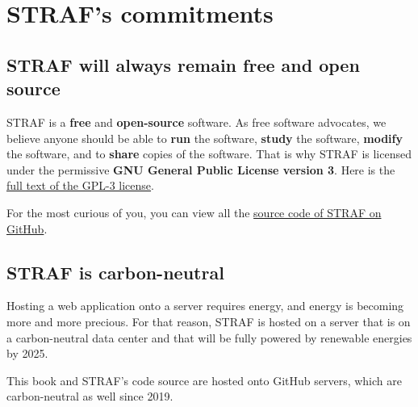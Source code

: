 \documentclass[
]{book}
\begin{document}
\hypertarget{strafs-commitments}{%
\chapter{STRAF's commitments}\label{strafs-commitments}}

\hypertarget{straf-will-always-remain-free-and-open-source}{%
\section{STRAF will always remain free and open source}\label{straf-will-always-remain-free-and-open-source}}

STRAF is a \textbf{free} and \textbf{open-source} software. As free software advocates, we believe
anyone should be able to \textbf{run} the software, \textbf{study} the software,
\textbf{modify} the software, and to \textbf{share} copies of the software. That is why
STRAF is licensed under the permissive \textbf{GNU General Public License version 3}.
Here is the \href{https://www.gnu.org/licenses/gpl-3.0.txt}{full text of the GPL-3 license}.

For the most curious of you, you can view all the \href{https://github.com/agouy/straf}{source code of STRAF on GitHub}.

\hypertarget{straf-is-carbon-neutral}{%
\section{STRAF is carbon-neutral}\label{straf-is-carbon-neutral}}

Hosting a web application onto a server requires energy, and energy is becoming
more and more precious. For that reason, STRAF is hosted on a server that is
on a carbon-neutral data center and that will be fully powered by renewable energies by 2025.

This book and STRAF's code source are hosted onto GitHub servers, which are
carbon-neutral as well since 2019.

  
\end{document}
